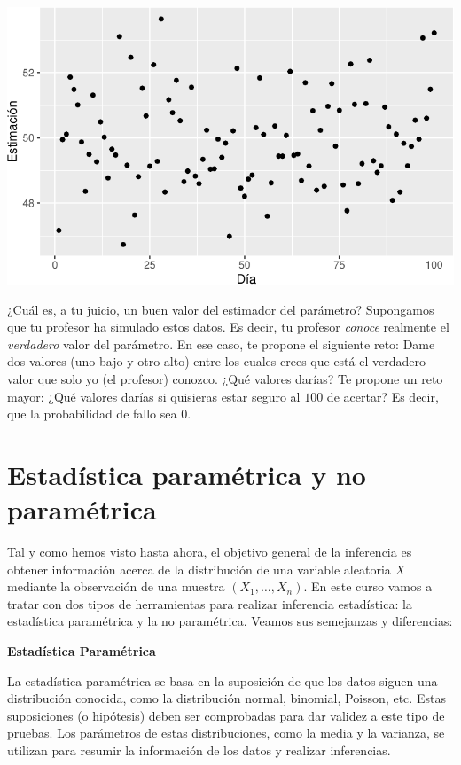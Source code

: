 \documentclass[
  letterpaper,
  DIV=11,
  numbers=noendperiod]{scrreprt}
\begin{document}
\begin{tcolorbox}
\includegraphics{intro_files/figure-pdf/sample3-1.pdf}

¿Cuál es, a tu juicio, un buen valor del estimador del parámetro?
Supongamos que tu profesor ha simulado estos datos. Es decir, tu
profesor \emph{conoce} realmente el \emph{verdadero} valor del
parámetro. En ese caso, te propone el siguiente reto: Dame dos valores
(uno bajo y otro alto) entre los cuales crees que está el verdadero
valor que solo yo (el profesor) conozco. ¿Qué valores darías? Te propone
un reto mayor: ¿Qué valores darías si quisieras estar seguro al \(100%
\) de acertar? Es decir, que la probabilidad de fallo sea \(0\).

\end{tcolorbox}

\hypertarget{estaduxedstica-paramuxe9trica-y-no-paramuxe9trica}{%
\section{Estadística paramétrica y no
paramétrica}\label{estaduxedstica-paramuxe9trica-y-no-paramuxe9trica}}

Tal y como hemos visto hasta ahora, el objetivo general de la inferencia
es obtener información acerca de la distribución de una variable
aleatoria \(X\) mediante la observación de una muestra
\((X_1,\ldots,X_n)\). En este curso vamos a tratar con dos tipos de
herramientas para realizar inferencia estadística: la estadística
paramétrica y la no paramétrica. Veamos sus semejanzas y diferencias:

\textbf{Estadística Paramétrica}

La estadística paramétrica se basa en la suposición de que los datos
siguen una distribución conocida, como la distribución normal, binomial,
Poisson, etc. Estas suposiciones (o hipótesis) deben ser comprobadas
para dar validez a este tipo de pruebas. Los parámetros de estas
distribuciones, como la media y la varianza, se utilizan para resumir la
información de los datos y realizar inferencias.
\end{document}
